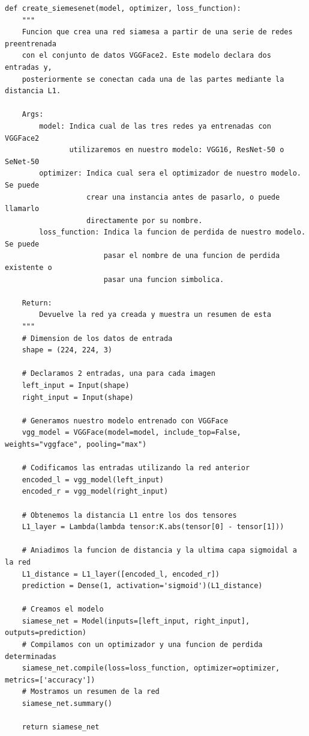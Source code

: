 \documentclass[11pt,a4paper]{article}
\begin{document}
\begin{lstlisting}[caption={Función para crear los modelos base.}, label={lst:base-net}]
def create_siemesenet(model, optimizer, loss_function):
    """
    Funcion que crea una red siamesa a partir de una serie de redes preentrenada
    con el conjunto de datos VGGFace2. Este modelo declara dos entradas y,
    posteriormente se conectan cada una de las partes mediante la distancia L1.
    
    Args:
        model: Indica cual de las tres redes ya entrenadas con VGGFace2
               utilizaremos en nuestro modelo: VGG16, ResNet-50 o SeNet-50
        optimizer: Indica cual sera el optimizador de nuestro modelo. Se puede
                   crear una instancia antes de pasarlo, o puede llamarlo
                   directamente por su nombre.
        loss_function: Indica la funcion de perdida de nuestro modelo. Se puede
                       pasar el nombre de una funcion de perdida existente o
                       pasar una funcion simbolica.
    
    Return:
        Devuelve la red ya creada y muestra un resumen de esta
    """
    # Dimension de los datos de entrada
    shape = (224, 224, 3)

    # Declaramos 2 entradas, una para cada imagen
    left_input = Input(shape)
    right_input = Input(shape)

    # Generamos nuestro modelo entrenado con VGGFace
    vgg_model = VGGFace(model=model, include_top=False, weights="vggface", pooling="max")

    # Codificamos las entradas utilizando la red anterior
    encoded_l = vgg_model(left_input)
    encoded_r = vgg_model(right_input)

    # Obtenemos la distancia L1 entre los dos tensores
    L1_layer = Lambda(lambda tensor:K.abs(tensor[0] - tensor[1]))

    # Aniadimos la funcion de distancia y la ultima capa sigmoidal a la red
    L1_distance = L1_layer([encoded_l, encoded_r])
    prediction = Dense(1, activation='sigmoid')(L1_distance)

    # Creamos el modelo
    siamese_net = Model(inputs=[left_input, right_input], outputs=prediction)
    # Compilamos con un optimizador y una funcion de perdida determinadas
    siamese_net.compile(loss=loss_function, optimizer=optimizer, metrics=['accuracy'])
    # Mostramos un resumen de la red
    siamese_net.summary()

    return siamese_net
\end{lstlisting}
\end{document}
